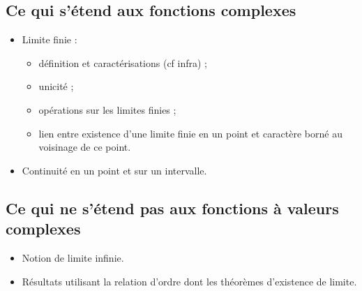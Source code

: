 \subsection{Ce qui s’étend aux fonctions complexes}
\begin{defprop}
    \begin{itemize}
        \item Limite finie :
        \begin{itemize}
            \item définition et caractérisations (cf infra) ;
            \item unicité ;
            \item opérations sur les limites finies ;
            \item lien entre existence d’une limite finie en un point et caractère borné au voisinage de ce point.
        \end{itemize}
        \item Continuité en un point et sur un intervalle.
    \end{itemize}
\end{defprop} 

\subsection{Ce qui ne s’étend pas aux fonctions à valeurs complexes}
\begin{defprop}
    \begin{itemize}
        \item Notion de limite infinie.
        \item Résultats utilisant la relation d’ordre dont les théorèmes d’existence de limite.
    \end{itemize}
\end{defprop}
